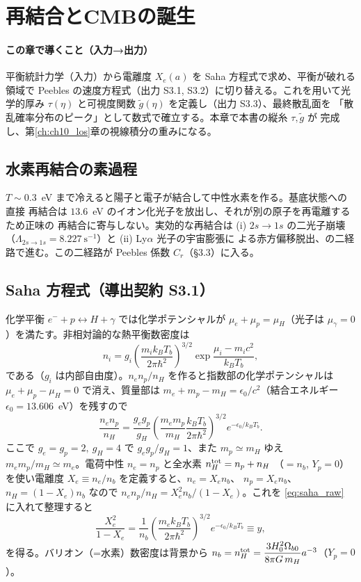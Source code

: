 \section{再結合とCMBの誕生}
\label{ch:ch03_recombination}

\paragraph{この章で導くこと（入力→出力）}
平衡統計力学（入力）から電離度 $X_e(a)$ を Saha 方程式で求め、平衡が破れる領域で
Peebles の速度方程式（出力 S3.1, S3.2）に切り替える。これを用いて光学的厚み
$\tau(\eta)$ と可視度関数 $\tilde g(\eta)$ を定義し（出力 S3.3）、最終散乱面を
「散乱確率分布のピーク」として数式で確立する。本章で本書の縦糸 $\tau,\tilde g$ が
完成し、第\ref{ch:ch10_los}章の視線積分の重みになる。

\subsection{水素再結合の素過程}
$T\sim 0.3$~eV まで冷えると陽子と電子が結合して中性水素を作る。基底状態への直接
再結合は $13.6$~eV のイオン化光子を放出し、それが別の原子を再電離するため正味の
再結合に寄与しない。実効的な再結合は (i) $2s\to1s$ の二光子崩壊
（$\Lambda_{2s\to1s}=8.227~\mathrm{s^{-1}}$）と (ii) Ly$\alpha$ 光子の宇宙膨張に
よる赤方偏移脱出、の二経路で進む。この二経路が Peebles 係数 $C_r$（\S3.3）に入る。

\subsection{Saha 方程式（導出契約 S3.1）}
化学平衡 $e^-+p\leftrightarrow H+\gamma$ では化学ポテンシャルが
$\mu_e+\mu_p=\mu_H$（光子は $\mu_\gamma=0$）を満たす。非相対論的な熱平衡数密度は
\begin{equation}
  n_i=g_i\left(\frac{m_ik_BT_b}{2\pi\hbar^2}\right)^{3/2}
  \exp\!\frac{\mu_i-m_ic^2}{k_BT_b},
  \label{eq:ni}
\end{equation}
である（$g_i$ は内部自由度）。$n_e n_p/n_H$ を作ると指数部の化学ポテンシャルは
$\mu_e+\mu_p-\mu_H=0$ で消え、質量部は $m_e+m_p-m_H=\epsilon_0/c^2$（結合エネルギー
$\epsilon_0=13.606$~eV）を残すので
\begin{equation}
  \frac{n_en_p}{n_H}=\frac{g_eg_p}{g_H}
  \left(\frac{m_em_p}{m_H}\frac{k_BT_b}{2\pi\hbar^2}\right)^{3/2}
  e^{-\epsilon_0/k_BT_b}.
  \label{eq:saha_raw}
\end{equation}
ここで $g_e=g_p=2,\ g_H=4$ で $g_eg_p/g_H=1$、また $m_p\simeq m_H$ ゆえ
$m_em_p/m_H\simeq m_e$。電荷中性 $n_e=n_p$ と全水素 $n_H^{\rm tot}=n_p+n_H$
（$=n_b$, $Y_p=0$）を使い電離度 $X_e\equiv n_e/n_b$ を定義すると、$n_e=X_en_b$、
$n_p=X_en_b$、$n_H=(1-X_e)n_b$ なので $n_en_p/n_H=X_e^2 n_b/(1-X_e)$。これを
\eqref{eq:saha_raw} に入れて整理すると
\begin{equation}
  \frac{X_e^2}{1-X_e}=\frac{1}{n_b}\left(\frac{m_ek_BT_b}{2\pi\hbar^2}\right)^{3/2}
  e^{-\epsilon_0/k_BT_b}\equiv y,
  \label{eq:saha}
\end{equation}
を得る。バリオン（=水素）数密度は背景から
$n_b=n_H^{\rm tot}=\dfrac{3H_0^2\Omega_{b0}}{8\pi G\,m_H}a^{-3}$（$Y_p=0$）。

